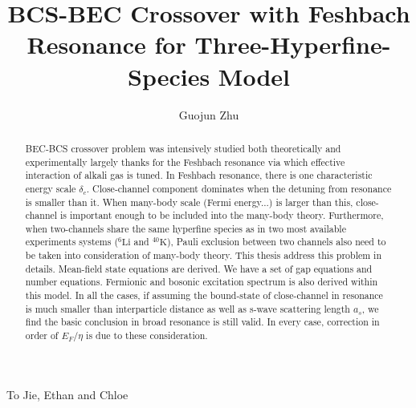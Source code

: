 \documentclass[edeposit,fullpage]{uiucthesis2009}
\begin{document}
\title{BCS-BEC Crossover with Feshbach Resonance for Three-Hyperfine-Species Model}
\author{Guojun Zhu}
\phdthesis
{}
\maketitle

\frontmatter

\begin{abstract}
BEC-BCS crossover problem was intensively studied both theoretically and experimentally largely thanks for the Feshbach resonance via which effective interaction of alkali gas is tuned.  In Feshbach resonance, there is one characteristic energy scale $\delta_c$. Close-channel component dominates when the detuning from resonance is smaller than it.  When many-body scale (Fermi energy...) is larger than this, close-channel is important enough to be included into the many-body theory.  Furthermore, when two-channels share the same hyperfine species as in two most available experiments systems (${}^6\text{Li}$ and ${}^{40}\text{K}$), Pauli exclusion between two channels also need to be taken into consideration of many-body theory.  This thesis address this problem in details.  Mean-field state equations  are derived. We have a set of gap equations and number equations.  Fermionic and bosonic excitation spectrum is also derived within this model.  In all the cases, if assuming the bound-state of close-channel in resonance is much smaller than interparticle distance as well as s-wave scattering length $a_s$, we find the basic conclusion in broad resonance is still valid. In every case, correction in order of $E_F/\eta$ is due to these consideration.  
\end{abstract}

\begin{dedication}
To Jie, Ethan and Chloe
\end{dedication}
\end{document}

